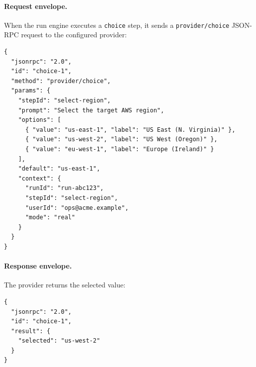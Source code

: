 \paragraph{Request envelope.}
When the run engine executes a \texttt{choice} step, it sends a
\texttt{provider/choice} JSON-RPC request to the configured provider:

\begin{verbatim}
{
  "jsonrpc": "2.0",
  "id": "choice-1",
  "method": "provider/choice",
  "params": {
    "stepId": "select-region",
    "prompt": "Select the target AWS region",
    "options": [
      { "value": "us-east-1", "label": "US East (N. Virginia)" },
      { "value": "us-west-2", "label": "US West (Oregon)" },
      { "value": "eu-west-1", "label": "Europe (Ireland)" }
    ],
    "default": "us-east-1",
    "context": {
      "runId": "run-abc123",
      "stepId": "select-region",
      "userId": "ops@acme.example",
      "mode": "real"
    }
  }
}
\end{verbatim}

\paragraph{Response envelope.}
The provider returns the selected value:

\begin{verbatim}
{
  "jsonrpc": "2.0",
  "id": "choice-1",
  "result": {
    "selected": "us-west-2"
  }
}
\end{verbatim}

